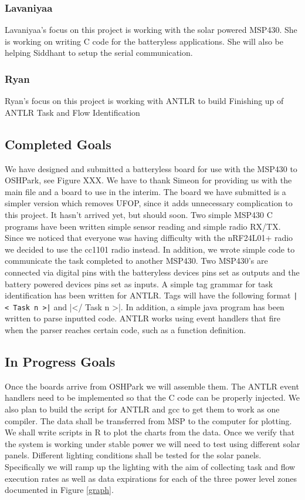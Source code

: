 \subsubsection{Lavaniyaa}
Lavaniyaa's focus on this project is working with the solar powered MSP430.
She is working on writing C code for the batteryless applications.
She will also be helping Siddhant to setup the serial communication.

\subsubsection{Ryan}
Ryan's focus on this project is working with ANTLR to build
Finishing up of ANTLR Task and Flow Identification

\subsection{Completed Goals}

We have designed and submitted a batteryless board for use with the MSP430 to OSHPark, see Figure XXX.
We have to thank Simeon for providing us with the main file and a board to use in the interim.
The board we have submitted is a simpler version which removes UFOP, since it adds unnecessary complication to this project.
It hasn't arrived yet, but should soon.
Two simple MSP430 C programs have been written simple sensor reading and simple radio RX/TX.
Since we noticed that everyone was having difficulty with the nRF24L01+ radio we decided to use the cc1101 radio instead.
In addition, we wrote simple code to communicate the task completed to another MSP430.
Two MSP430's are connected via digital pins with the batteryless devices pins set as outputs and the battery powered devices pins set as inputs.
A simple tag grammar for task identification has been written for ANTLR.
Tags will have the following format {\tt |< Task n >|} and |</ Task n >|.
In addition, a simple java program has been written to parse inputted code.
ANTLR works using event handlers that fire when the parser reaches certain code, such as a function definition.

\subsection{In Progress Goals}


Once the boards arrive from OSHPark we will assemble them.
The ANTLR event handlers need to be implemented so that the C code can be properly injected.
We also plan to build the script for ANTLR and gcc to get them to work as one compiler.
The data shall be transferred from MSP to the computer for plotting.
We shall write scripts in R to plot the charts from the data.
Once we verify that the system is working under stable power we will need to test using different solar panels.
Different lighting conditions shall be tested for the solar panels.
Specifically we will ramp up the lighting with the aim of collecting task and flow execution rates as well as data expirations for each of the three power level zones documented in Figure \ref{graph}.


